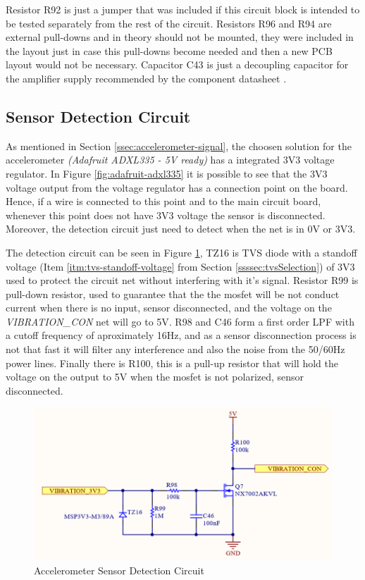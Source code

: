 	Resistor R92 is just a jumper that was included if this circuit block is intended to be tested separately from the rest of the circuit. Resistors R96 and R94 are external pull-downs and in theory should not be mounted, they were included in the layout just in case this pull-downs become needed and then a new PCB layout would not be necessary. Capacitor C43 is just a decoupling capacitor for the amplifier supply recommended by the component datasheet \cite{mcp6001-datasheet}.

\subsection{Sensor Detection Circuit}\label{ssec:accelerometer-sensor-detection-circuit}

	As mentioned in Section \ref{ssec:accelerometer-signal}, the choosen solution for the accelerometer \textit{(Adafruit ADXL335 - 5V ready)} has a integrated 3V3 voltage regulator. In Figure \ref{fig:adafruit-adxl335} it is possible to see that the 3V3 voltage output from the voltage regulator has a connection point on the board. Hence, if a wire is connected to this point and to the main circuit board, whenever this point does not have 3V3 voltage the sensor is disconnected. Moreover, the detection circuit just need to detect when the net is in 0V or 3V3.
	\par
	The detection circuit can be seen in Figure \ref{fig:accelerometer-sensor-detection-circuit}, TZ16 is TVS diode with a standoff voltage (Item \ref{itm:tvs-standoff-voltage} from Section \ref{ssssec:tvsSelection}) of 3V3 used to protect the circuit net without interfering with it's signal. Resistor R99 is pull-down resistor, used to guarantee that the the mosfet will be not conduct current when there is no input, sensor disconnected, and the voltage on the \textit{VIBRATION_CON} net will go to 5V. R98 and C46 form a first order LPF with a cutoff frequency of aproximately 16Hz, and as a sensor disconnection process is not that fast it will filter any interference and also the noise from the 50/60Hz power lines. Finally there is R100, this is a pull-up resistor that will hold the voltage on the output to 5V when the mosfet is not polarized, sensor disconnected.

	\begin{figure}[htbp]
		\centering
			\includegraphics[scale=0.95]{figuras/fig-accelerometer-sensor-detection-circuit.png}
		\caption{Accelerometer Sensor Detection Circuit \cite{accelerometer-sensor-detection-circuit}}
		\label{fig:accelerometer-sensor-detection-circuit}
	\end{figure}